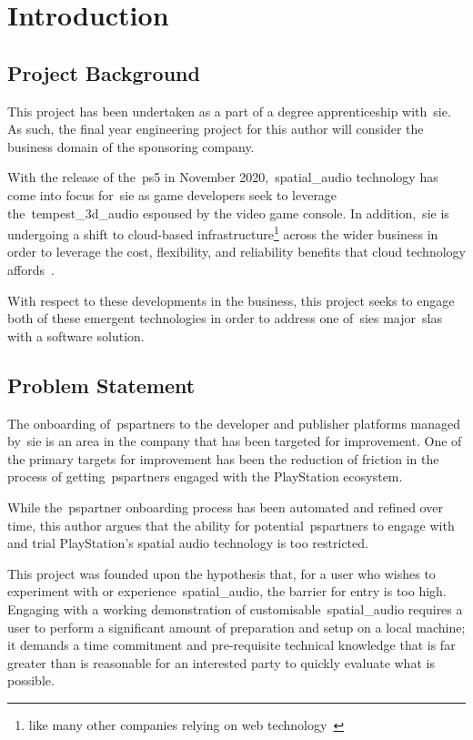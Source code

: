 \thispagestyle{plain}
\newpage
\section{Introduction}\label{sec:introduction}
\subsection{Project Background}\label{subsec:project-background}
\normalsize

This project has been undertaken as a part of a degree apprenticeship with~\gls{sie}.
As such, the final year engineering project for this author will consider the business domain of the sponsoring company.

With the release of the~\gls{ps5} in November 2020,~\gls{spatial_audio} technology has come into focus for~\gls{sie} as game developers seek to leverage the~\gls{tempest_3d_audio} espoused by the video game console.
In addition,~\gls{sie} is undergoing a shift to cloud-based infrastructure\footnote{like many other companies relying on web technology~\citep{cc_overview}} across the wider business in order to leverage the cost, flexibility, and reliability benefits that cloud technology affords~\citep{cc_overview}.

With respect to these developments in the business, this project seeks to engage both of these emergent technologies in order to address one of~\gls{sie}\textquotesingle s major~\glspl{sla} with a software solution.

\subsection{Problem Statement}\label{subsec:problem-statement}

The onboarding of~\glspl{pspartner} to the developer and publisher platforms managed by~\gls{sie} is an area in the company that has been targeted for improvement.
One of the primary targets for improvement has been the reduction of friction in the process of getting~\glspl{pspartner} engaged with the PlayStation ecosystem.

While the~\gls{pspartner} onboarding process has been automated and refined over time, this author argues that the ability for potential~\glspl{pspartner} to engage with and trial PlayStation's spatial audio technology is too restricted.

This project was founded upon the hypothesis that, for a user who wishes to experiment with or experience~\gls{spatial_audio}, the barrier for entry is too high.
Engaging with a working demonstration of customisable~\gls{spatial_audio} requires a user to perform a significant amount of preparation and setup on a local machine;
it demands a time commitment and pre-requisite technical knowledge that is far greater than is reasonable for an interested party to quickly evaluate what is possible.

